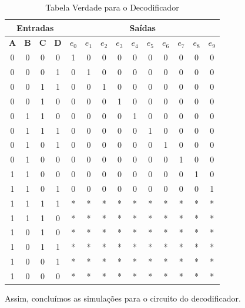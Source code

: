 \documentclass[12pt]{article}
\begin{document}
\begin{table}[H]
    \centering
    \caption{Tabela Verdade para o Decodificador}
    \begin{tabular}{|c|c|c|c||c|c|c|c|c|c|c|c|c|c|}\hline
    \multicolumn{4}{|c||}{Entradas} & \multicolumn{10}{|c|}{Saídas} \\\hline
    \textbf{A} & \textbf{B} & \textbf{C} & \textbf{D} & \textbf{$e_{0}$} & \textbf{$e_{1}$} & \textbf{$e_{2}$} & \textbf{$e_{3}$} & \textbf{$e_{4}$} & \textbf{$e_{5}$} & \textbf{$e_{6}$} & \textbf{$e_{7}$} & \textbf{$e_{8}$} & \textbf{$e_{9}$} \\\hline
    0 & 0 & 0 & 0 & 1 & 0 & 0 & 0 & 0 & 0 & 0 & 0 & 0 & 0 \\\hline
    0 & 0 & 0 & 1 & 0 & 1 & 0 & 0 & 0 & 0 & 0 & 0 & 0 & 0 \\\hline
    0 & 0 & 1 & 1 & 0 & 0 & 1 & 0 & 0 & 0 & 0 & 0 & 0 & 0 \\\hline
    0 & 0 & 1 & 0 & 0 & 0 & 0 & 1 & 0 & 0 & 0 & 0 & 0 & 0 \\\hline
    0 & 1 & 1 & 0 & 0 & 0 & 0 & 0 & 1 & 0 & 0 & 0 & 0 & 0 \\\hline
    0 & 1 & 1 & 1 & 0 & 0 & 0 & 0 & 0 & 1 & 0 & 0 & 0 & 0 \\\hline
    0 & 1 & 0 & 1 & 0 & 0 & 0 & 0 & 0 & 0 & 1 & 0 & 0 & 0 \\\hline
    0 & 1 & 0 & 0 & 0 & 0 & 0 & 0 & 0 & 0 & 0 & 1 & 0 & 0 \\\hline
    1 & 1 & 0 & 0 & 0 & 0 & 0 & 0 & 0 & 0 & 0 & 0 & 1 & 0 \\\hline
    1 & 1 & 0 & 1 & 0 & 0 & 0 & 0 & 0 & 0 & 0 & 0 & 0 & 1 \\\hline
    1 & 1 & 1 & 1 & * & * & * & * & * & * & * & * & * & * \\\hline
    1 & 1 & 1 & 0 & * & * & * & * & * & * & * & * & * & * \\\hline
    1 & 0 & 1 & 0 & * & * & * & * & * & * & * & * & * & * \\\hline
    1 & 0 & 1 & 1 & * & * & * & * & * & * & * & * & * & * \\\hline
    1 & 0 & 0 & 1 & * & * & * & * & * & * & * & * & * & * \\\hline
    1 & 0 & 0 & 0 & * & * & * & * & * & * & * & * & * & * \\\hline
    \end{tabular}\label{tab:truth_table_decoder}
\end{table}

Assim, concluímos as simulações para o circuito do decodificador.
\end{document}
